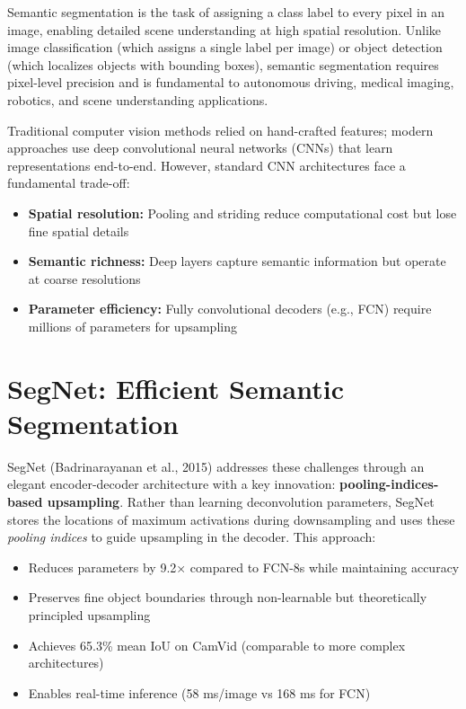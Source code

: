 \documentclass[11pt,a4paper]{report}
\begin{document}
Semantic segmentation is the task of assigning a class label to every pixel in an image, enabling detailed scene understanding at high spatial resolution. Unlike image classification (which assigns a single label per image) or object detection (which localizes objects with bounding boxes), semantic segmentation requires pixel-level precision and is fundamental to autonomous driving, medical imaging, robotics, and scene understanding applications.

Traditional computer vision methods relied on hand-crafted features; modern approaches use deep convolutional neural networks (CNNs) that learn representations end-to-end. However, standard CNN architectures face a fundamental trade-off:
\begin{itemize}
  \item \textbf{Spatial resolution:} Pooling and striding reduce computational cost but lose fine spatial details
  \item \textbf{Semantic richness:} Deep layers capture semantic information but operate at coarse resolutions
  \item \textbf{Parameter efficiency:} Fully convolutional decoders (e.g., FCN) require millions of parameters for upsampling
\end{itemize}

\section*{SegNet: Efficient Semantic Segmentation}

SegNet (Badrinarayanan et al., 2015) addresses these challenges through an elegant encoder-decoder architecture with a key innovation: \textbf{pooling-indices-based upsampling}. Rather than learning deconvolution parameters, SegNet stores the locations of maximum activations during downsampling and uses these \textit{pooling indices} to guide upsampling in the decoder. This approach:

\begin{itemize}
  \item Reduces parameters by 9.2× compared to FCN-8s while maintaining accuracy
  \item Preserves fine object boundaries through non-learnable but theoretically principled upsampling
  \item Achieves 65.3\% mean IoU on CamVid (comparable to more complex architectures)
  \item Enables real-time inference (58 ms/image vs 168 ms for FCN)
\end{itemize}
\end{document}
